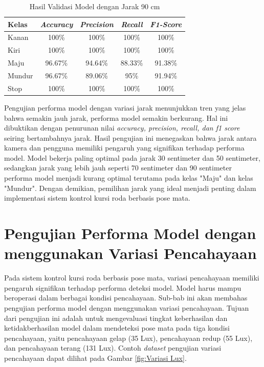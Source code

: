 \begin{longtable}{|l|c|c|c|c|}
  \caption{Hasil Validasi Model dengan Jarak 90 cm}
  \label{tb:vs_model6} \\
  \hline
  \rowcolor[HTML]{C0C0C0} 
  \textbf{Kelas} & \textbf{\emph{Accuracy}} & \textbf{\emph{Precision}} & \textbf{\emph{Recall}} & \textbf{\emph{F1-Score}} \\ \hline
  Kanan    & 100\%            & 100\%             & 100\%           & 100\%            \\ \hline
  Kiri     & 100\%          & 100\%           & 100\%           & 100\%           \\ \hline
  Maju      & 96.67\%          & 94.64\%           & 88.33\%          & 91.38\%          \\ \hline
  Mundur     & 96.67\%            & 89.06\%             & 95\%           & 91.94\%            \\ \hline
  Stop  & 100\%            & 100\%             & 100\%           & 100\%            \\ \hline
\end{longtable}

Pengujian performa model dengan variasi jarak menunjukkan tren yang jelas bahwa semakin jauh jarak, performa model semakin berkurang. Hal ini dibuktikan dengan penurunan nilai \emph{accuracy, precision, recall, dan f1 score} seiring bertambahnya jarak. Hasil pengujian ini menegaskan bahwa jarak antara kamera dan pengguna memiliki pengaruh yang signifikan terhadap performa model. Model bekerja paling optimal pada jarak 30 sentimeter dan 50 sentimeter, sedangkan jarak yang lebih jauh seperti 70 sentimeter dan 90 sentimeter performa model menjadi kurang optimal terutama pada kelas "Maju" dan kelas "Mundur". Dengan demikian, pemilihan jarak yang ideal menjadi penting dalam implementasi sistem kontrol kursi roda berbasis pose mata.

\section{Pengujian Performa Model dengan menggunakan Variasi Pencahayaan}

Pada sistem kontrol kursi roda berbasis pose mata, variasi pencahayaan memiliki pengaruh signifikan terhadap performa deteksi model. Model harus mampu beroperasi dalam berbagai kondisi pencahayaan. Sub-bab ini akan membahas pengujian performa model dengan menggunakan variasi pencahayaan. Tujuan dari pengujian ini adalah untuk mengevaluasi tingkat keberhasilan dan ketidakberhasilan model dalam mendeteksi pose mata pada tiga kondisi pencahayaan, yaitu pencahayaan gelap (35 Lux), pencahayaan redup (55 Lux), dan pencahayaan terang (131 Lux). Contoh \emph{dataset} pengujian variasi pencahayaan dapat dilihat pada Gambar \ref{fig:Variasi Lux}.

